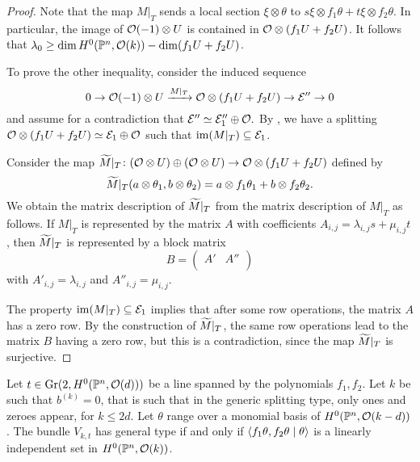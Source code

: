 \begin{proof}
	Note that the map $M|_T$ sends a local section $\xi \otimes \theta$ to $s\xi \otimes f_1 \theta + t\xi \otimes f_2 \theta$. In particular, the image of $\mathcal{O}(-1)\otimes U$ is contained in $\mathcal{O} \otimes (f_1 U + f_2 U)$. It follows that
	$\lambda_0 \geq \dim H^0(\mathbb{P}^n,\mathcal{O}(k)) - \dim ({f_1 U + f_2 U})$.

  To prove the other inequality, consider the induced sequence
  \[
  	0 \to \mathcal{O}(-1)\otimes U \xrightarrow{M|_T} \mathcal{O}\otimes (f_1 U + f_2 U) \to \mathcal{E}'' \to 0
  \]
  and assume for a contradiction that $\mathcal{E}'' \simeq \mathcal{E}_1''\oplus \mathcal{O}.$ By , we have a splitting $\mathcal{O}\otimes (f_1 U + f_2 U) \simeq \mathcal{E}_1 \oplus \mathcal{O}$ such that $\operatorname{im}(M|_T) \subseteq \mathcal{E}_1$. 

  Consider the map
  $\widetilde M|_T \colon (\mathcal{O} \otimes U) \oplus (\mathcal{O} \otimes U) \to \mathcal{O} \otimes (f_1 U + f_2 U)$
  defined by $$\widetilde M|_T(a\otimes \theta_1,b \otimes \theta_2)=a\otimes f_1 \theta_1 + b \otimes f_2 \theta_2.$$
  We obtain the matrix description of $\widetilde M|_T$ from the matrix description of $M|_T$ as follows. If $M|_T$ is represented by the matrix $A$ with coefficients $A_{i,j} = \lambda_{i,j} s + \mu_{i,j} t$, then $\widetilde M|_T$ is represented by a block matrix
  \[
  	B = \left(
  		\begin{array}{c|c}
  			A' & A'' \\
  		\end{array}
  	\right)
  \]
  with $A'_{i,j} = \lambda_{i,j}$ and $A''_{i,j} = \mu_{i,j}$.

  The property $\operatorname{im}(M|_T)\subseteq \mathcal{E}_1$ implies that after some row operations, the matrix $A$ has a zero row. By the construction of $\widetilde M|_T$, the same row operations lead to the matrix $B$ having a zero row, but this is a contradiction, since the map $\widetilde M|_T$ is surjective.
\end{proof}

\begin{corollary} \label{no-more-than-ones}
	Let $t\in \operatorname{Gr}(2,H^0(\mathbb{P}^n, \mathcal{O}(d)))$ be a line spanned by the polynomials $f_1,f_2$. Let $k$ be such that $b^{(k)}=0$, that is such that in the generic splitting type, only ones and zeroes appear, \eg for $k\leq 2d$. Let $\theta$ range over a monomial basis of $H^0(\mathbb{P}^n, \mathcal{O}(k-d))$. The bundle $V_{k,t}$ has general type if and only if
	$\left\langle f_1\theta,f_2\theta \mid \theta \right\rangle$ is a linearly independent set in $H^0(\mathbb{P}^n,\mathcal{O}(k))$.
\end{corollary}

